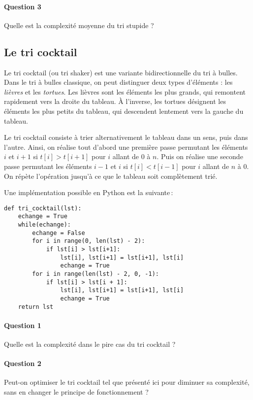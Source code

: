 \documentclass{article}%
\begin{document}
\paragraph{Question 3} Quelle est la complexité moyenne du tri stupide ?

\subsection{Le tri cocktail}

Le tri cocktail (ou tri shaker) est une variante bidirectionnelle du tri à bulles. Dans le tri à bulles classique, on peut distinguer deux types d'éléments : les \textit{lièvres} et les \textit{tortues}. Les lièvres sont les éléments les plus grands, qui remontent rapidement vers la droite du tableau. À l'inverse, les tortues désignent les éléments les plus petits du tableau, qui descendent lentement vers la gauche du tableau.

Le tri cocktail consiste à trier alternativement le tableau dans un sens, puis dans l'autre. Ainsi, on réalise tout d'abord une première passe permutant les éléments $i$ et $i+1$ si $t[i] > t[i+1]$ pour $i$ allant de $0$ à $n$. Puis on réalise une seconde passe
permutant les éléments $i-1$ et $i$ si $t[i] < t[i-1]$ pour $i$ allant de $n$ à $0$. On répète l'opération jusqu'à ce que le tableau soit complètement trié.

Une implémentation possible en Python est la suivante\,:
\begin{verbatim}
def tri_cocktail(lst):
    echange = True
    while(echange):
        echange = False
        for i in range(0, len(lst) - 2):
            if lst[i] > lst[i+1]:
                lst[i], lst[i+1] = lst[i+1], lst[i]
                echange = True
        for i in range(len(lst) - 2, 0, -1):
            if lst[i] > lst[i + 1]:
                lst[i], lst[i+1] = lst[i+1], lst[i]
                echange = True
    return lst
\end{verbatim}

\paragraph{Question 1} Quelle est la complexité dans le pire cas du tri cocktail ?

\paragraph{Question 2} Peut-on optimiser le tri cocktail tel que présenté ici pour diminuer sa complexité, sans en changer le principe de fonctionnement ?
\end{document}
